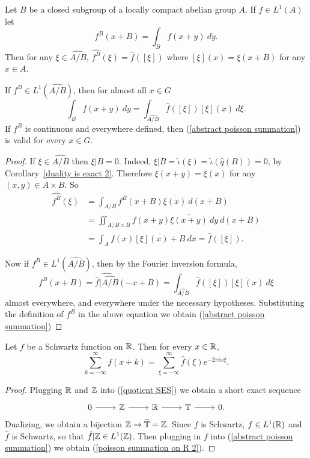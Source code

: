 \begin{theorem}
Let $B$ be a closed subgroup of a locally compact abelian group $A$.
If $f \in L^{1}(A)$ let
\[f^{B}(x + B) = \int_{B} f(x + y)~dy.\]
Then for any $\xi \in \widehat{A/B}$, $\widehat{f^{B}}(\xi) = \hat{f}([\xi])$
where $[\xi](x) = \xi(x + B)$ for any $x \in A$.

If $f^{B} \in L^{1}(\widehat{A/B})$, then for almost all $x \in G$
\begin{equation}\label{abstract poisson summation}
\int_{B} f(x + y)~dy = \int_{\widehat{A/B}} \hat{f}([\xi]) [\xi](x) ~d\xi.
\end{equation}
If $f^{B}$ is continuous and everywhere defined, then (\ref{abstract poisson summation}) is valid for every $x \in G$.
\end{theorem}
\begin{proof}
If $\xi \in \widehat{A/B}$ then $\xi|B = 0$. Indeed, $\xi|B = \hat{\iota}(\xi) = \hat{\iota}(\hat{q}(B)) = 0$, by Corollary~\ref{duality is exact 2}.
Therefore $\xi(x + y) = \xi(x)$ for any $(x, y) \in A \times B$.
So
\begin{align*}\widehat{f^{B}}(\xi) &= \int_{A/B} f^{B}(x + B) \overline{\xi(x)}~d(x + B)\\& = \iint_{A/B \times B} f(x + y) \overline{\xi(x + y)}~dy~d(x+B) \\&= \int_{A} f(x)\overline{[\xi](x) + B}~dx = \hat{f}([\xi]).\end{align*}

Now if $f^{B} \in L^{1}(\widehat{A/B})$, then by the Fourier inversion formula,
\[f^{B}(x + B) = \widehat{\hat{f}|\widehat{A/B}}(-x + B) = \int_{\widehat{A/B}} \hat{f}([\xi]) \overline{[\xi](x)}~d\xi\]
almost everywhere, and everywhere under the necessary hypotheses.
Substituting the definition of $f^{B}$ in the above equation we obtain (\ref{abstract poisson summation})
\end{proof}

\begin{corollary}\label{poisson summation on R}
Let $f$ be a Schwartz function on $\mathbb{R}$. Then for every $x \in \mathbb{R}$,
\begin{equation}\label{poisson summation on R 2}
\sum_{k=-\infty}^{\infty} f(x + k) = \sum_{\xi = -\infty}^{\infty} \hat{f}(\xi) e^{-2\pi ix\xi}.
\end{equation}
\end{corollary}
\begin{proof}
Plugging $\mathbb{R}$ and $\mathbb{Z}$ into (\ref{quotient SES}) we obtain a short exact sequence
\[\begin{tikzcd}
0 \arrow[r] & \ZZ \arrow[r] & \RR \arrow[r] & \Torus \arrow[r] & 0.
\end{tikzcd}
\]
Dualizing, we obtain a bijection $\mathbb{Z} \to \widehat{\mathbb{T}} = \mathbb{Z}$.
Since $f$ is Schwartz, $f \in L^{1}(\mathbb{R})$ and $\hat{f}$ is Schwartz, so that $\hat{f}|\mathbb{Z} \in L^{1}(\mathbb{Z})$.
Then plugging in $f$ into (\ref{abstract poisson summation}) we obtain (\ref{poisson summation on R 2}).
\end{proof}

